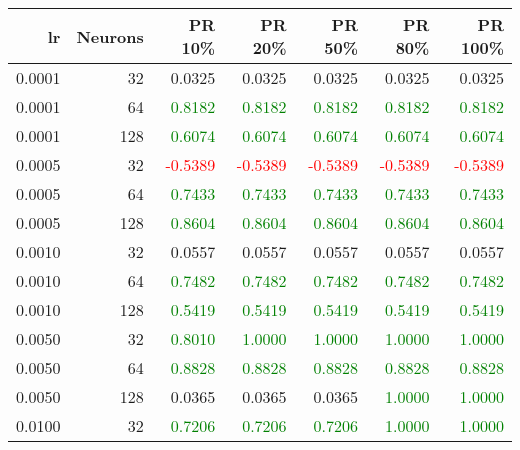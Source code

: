 \begin{tabular}{rrrrrrr}
\toprule
lr & Neurons & PR 10\% & PR 20\% & PR 50\% & PR 80\% & PR 100\% \\
\midrule
0.0001 & 32 & \textcolor{blu} {0.0325} & \textcolor{blu} {0.0325} & \textcolor{blu} {0.0325} & \textcolor{blu} {0.0325} & \textcolor{blu} {0.0325} \\
0.0001 & 64 & \textcolor{green} {0.8182} & \textcolor{green} {0.8182} & \textcolor{green} {0.8182} & \textcolor{green} {0.8182} & \textcolor{green} {0.8182} \\
0.0001 & 128 & \textcolor{green} {0.6074} & \textcolor{green} {0.6074} & \textcolor{green} {0.6074} & \textcolor{green} {0.6074} & \textcolor{green} {0.6074} \\
0.0005 & 32 & \textcolor{red} {-0.5389} & \textcolor{red} {-0.5389} & \textcolor{red} {-0.5389} & \textcolor{red} {-0.5389} & \textcolor{red} {-0.5389} \\
0.0005 & 64 & \textcolor{green} {0.7433} & \textcolor{green} {0.7433} & \textcolor{green} {0.7433} & \textcolor{green} {0.7433} & \textcolor{green} {0.7433} \\
0.0005 & 128 & \textcolor{green} {0.8604} & \textcolor{green} {0.8604} & \textcolor{green} {0.8604} & \textcolor{green} {0.8604} & \textcolor{green} {0.8604} \\
0.0010 & 32 & \textcolor{blu} {0.0557} & \textcolor{blu} {0.0557} & \textcolor{blu} {0.0557} & \textcolor{blu} {0.0557} & \textcolor{blu} {0.0557} \\
0.0010 & 64 & \textcolor{green} {0.7482} & \textcolor{green} {0.7482} & \textcolor{green} {0.7482} & \textcolor{green} {0.7482} & \textcolor{green} {0.7482} \\
0.0010 & 128 & \textcolor{green} {0.5419} & \textcolor{green} {0.5419} & \textcolor{green} {0.5419} & \textcolor{green} {0.5419} & \textcolor{green} {0.5419} \\
0.0050 & 32 & \textcolor{green} {0.8010} & \textcolor{green} {1.0000} & \textcolor{green} {1.0000} & \textcolor{green} {1.0000} & \textcolor{green} {1.0000} \\
0.0050 & 64 & \textcolor{green} {0.8828} & \textcolor{green} {0.8828} & \textcolor{green} {0.8828} & \textcolor{green} {0.8828} & \textcolor{green} {0.8828} \\
0.0050 & 128 & \textcolor{blu} {0.0365} & \textcolor{blu} {0.0365} & \textcolor{blu} {0.0365} & \textcolor{green} {1.0000} & \textcolor{green} {1.0000} \\
0.0100 & 32 & \textcolor{green} {0.7206} & \textcolor{green} {0.7206} & \textcolor{green} {0.7206} & \textcolor{green} {1.0000} & \textcolor{green} {1.0000} \\

\end{tabular}

